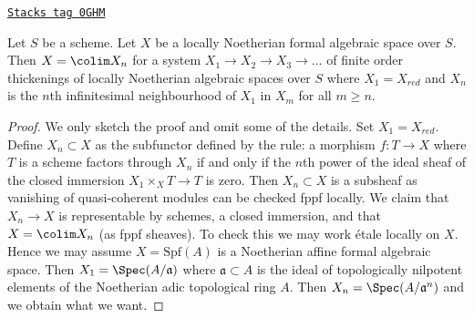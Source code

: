 \begin{lemma}
\label{formal-spaces-lemma-structure-locally-noetherian}
\href{https://stacks.math.columbia.edu/tag/0GHM}{\texttt{Stacks tag 0GHM}}

Let $S$ be a scheme. Let $X$ be a locally Noetherian formal algebraic space
over $S$. Then $X = \colim X_n$ for a system $X_1 \to X_2 \to X_3 \to \ldots$
of finite order thickenings of locally Noetherian algebraic spaces over $S$
where $X_1 = X_{red}$ and $X_n$ is the $n$th infinitesimal neighbourhood of
$X_1$ in $X_m$ for all $m \geq n$.
\end{lemma}

\begin{proof}
We only sketch the proof and omit some of the details.
Set $X_1 = X_{red}$. Define $X_n \subset X$ as the subfunctor
defined by the rule: a morphism $f : T \to X$ where $T$ is a scheme factors
through $X_n$ if and only if the $n$th power of the ideal sheaf
of the closed immersion $X_1 \times_X T \to T$ is zero. Then $X_n \subset X$
is a subsheaf as vanishing of quasi-coherent modules can be checked
fppf locally. We claim that $X_n \to X$ is representable by schemes,
a closed immersion, and that $X = \colim X_n$ (as fppf sheaves).
To check this we may work \'etale locally on $X$. Hence we may assume
$X = \text{Spf}(A)$ is a Noetherian affine formal algebraic space.
Then $X_1 = \Spec(A/\mathfrak a)$ where $\mathfrak a \subset A$
is the ideal of topologically nilpotent elements of the Noetherian
adic topological ring $A$. Then $X_n = \Spec(A/\mathfrak a^n)$
and we obtain what we want.
\end{proof}

